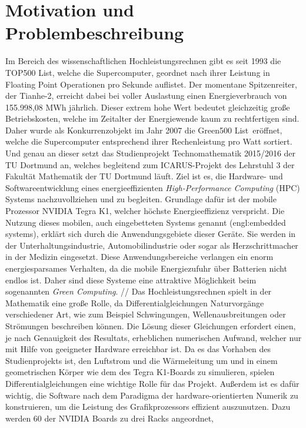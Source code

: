 \section{Motivation und Problembeschreibung}
Im Bereich des wissenschaftlichen Hochleistungsrechnen gibt es seit 1993 die
\glqq TOP500 List\grqq \cite{Top500}, welche die Supercomputer, geordnet nach ihrer Leistung 
in Floating Point Operationen pro Sekunde auflistet. Der momentane Spitzenreiter, 
der Tianhe-2, erreicht dabei bei voller Auslastung einen Energieverbrauch von 155.998,08 MWh 
jährlich. Dieser extrem hohe Wert bedeutet gleichzeitig große Betriebskosten,
 welche im Zeitalter der Energiewende kaum zu rechtfertigen sind. Daher wurde 
als Konkurrenzobjekt im Jahr 2007 die \glqq Green500 List\grqq\, eröffnet, welche 
die Supercomputer entsprechend ihrer Rechenleistung pro Watt sortiert. Und genau 
an dieser setzt das Studienprojekt Technomathematik 2015/2016 der TU Dortmund an, 
welches begleitend zum ICARUS-Projekt des Lehrstuhl 3 der Fakultät Mathematik der TU Dortmund läuft. 
Ziel ist es, die Hardware- und Softwareentwicklung eines energieeffizienten 
\textit{High-Performance Computing} (HPC) Systems nachzuvollziehen und zu begleiten. 
Grundlage dafür ist der mobile Prozessor NVIDIA Tegra K1, 
welcher höchste Energieeffizienz verspricht. Die Nutzung dieses mobilen, 
auch eingebetteten Systems genannt (engl:\glqq embedded systems\grqq), 
erklärt sich durch die Anwendungsgebiete dieser Geräte. 
Sie werden in der Unterhaltungsindustrie, Automobilindustrie oder sogar als Herzschrittmacher in der Medizin eingesetzt. 
Diese Anwendungsbereiche verlangen ein enorm energiesparsames Verhalten, da die mobile Energiezufuhr über Batterien nicht endlos ist.
Daher sind diese Systeme eine attraktive Möglichkeit beim sogenannten \textit{Green Computing}. 
//
Das Hochleistungsrechnen spielt in der Mathematik eine große Rolle,
 da Differentialgleichungen Naturvorgänge verschiedener Art, wie zum Beispiel Schwingungen,
 Wellenausbreitungen oder Strömungen beschreiben können. Die Lösung dieser Gleichungen erfordert einen,
 je nach Genauigkeit des Resultats, erheblichen numerischen Aufwand,
 welcher nur mit Hilfe von geeigneter Hardware erreichbar ist. Da es das Vorhaben des Studienprojekts ist,
 den Luftstrom und die Wärmeleitung um und in einem geometrischen Körper wie dem des Tegra K1-Boards zu simulieren,
 spielen Differentialgleichungen eine wichtige Rolle für das Projekt. Außerdem ist es dafür wichtig,
 die Software nach dem Paradigma der hardware-orientierten Numerik zu konstruieren,
 um die Leistung des Grafikprozessors effizient auszunutzen. Dazu werden 60 der NVIDIA Boards zu drei Racks angeordnet,
